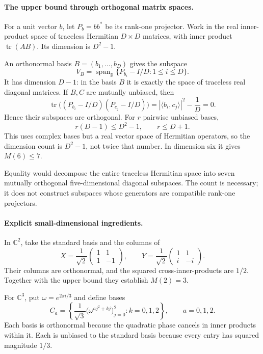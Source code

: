 \documentclass[11pt]{article}
\begin{document}
\paragraph{The upper bound through orthogonal matrix spaces.}
For a unit vector $b$, let $P_b=bb^*$ be its rank-one projector. Work in the real inner-product space of traceless Hermitian $D\times D$ matrices, with inner product $\operatorname{tr}(AB)$. Its dimension is $D^2-1$.

An orthonormal basis $B=(b_1,\ldots,b_D)$ gives the subspace
\[
 V_B=\operatorname{span}_{\mathbb R}
       \{P_{b_i}-I/D:1\le i\le D\}.
\]
It has dimension $D-1$: in the basis $B$ it is exactly the space of traceless real diagonal matrices. If $B,C$ are mutually unbiased, then
\[
 \operatorname{tr}\bigl((P_{b_i}-I/D)(P_{c_j}-I/D)\bigr)
 =|\langle b_i,c_j\rangle|^2-\frac1D=0.
\]
Hence their subspaces are orthogonal. For $r$ pairwise unbiased bases,
\[
 r(D-1)\le D^2-1,\qquad r\le D+1.
\]
This uses complex bases but a real vector space of Hermitian operators, so the dimension count is $D^2-1$, not twice that number. In dimension six it gives $M(6)\le7$.

Equality would decompose the entire traceless Hermitian space into seven mutually orthogonal five-dimensional diagonal subspaces. The count is necessary; it does not construct subspaces whose generators are compatible rank-one projectors.

\paragraph{Explicit small-dimensional ingredients.}
In $\mathbb C^2$, take the standard basis and the columns of
\[
 X=\frac1{\sqrt2}\begin{pmatrix}1&1\\1&-1\end{pmatrix},
 \qquad
 Y=\frac1{\sqrt2}\begin{pmatrix}1&1\\ i&-i\end{pmatrix}.
\]
Their columns are orthonormal, and the squared cross-inner-products are $1/2$. Together with the upper bound they establish $M(2)=3$.

For $\mathbb C^3$, put $\omega=e^{2\pi i/3}$ and define bases
\[
 C_a=\left\{\frac1{\sqrt3}
       \bigl(\omega^{aj^2+kj}\bigr)_{j=0}^{2}:
       k=0,1,2\right\},\qquad a=0,1,2.
\]
Each basis is orthonormal because the quadratic phase cancels in inner products within it. Each is unbiased to the standard basis because every entry has squared magnitude $1/3$.
\end{document}
